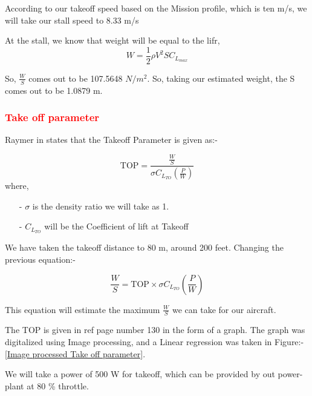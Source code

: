 \documentclass[12 pt]{article}
\begin{document}
According to our takeoff speed based on the Mission profile, which is ten m/s, we will take our stall speed to 8.33 m/s

At the stall, we know that weight will be equal to the lifr,
$$ W = \frac{1}{2} \rho V^2 S C_{L_{max}} $$

So, $\frac{W}{S}$ comes out to be 107.5648 $ N/m^2 $. So, taking our estimated weight, the S comes out to be 1.0879 m.


\subsubsection{\textcolor{red}{Take off parameter}}

Raymer in \cite{Raymer2006} states that the Takeoff Parameter is given as:- 

$$\text{TOP} = \frac{\frac{W}{S}}{ \sigma C_{L_{TO}} \left( \frac{P}{W} \right) }$$
where,
\begin{itemize}
    \item[-] $\sigma$ is the density ratio we will take as 1.
    \item [-] $C_{L_{TO}}$ will be the Coefficient of lift at Takeoff 
\end{itemize}

We have taken the takeoff distance to 80 m, around 200 feet. Changing the previous equation:-

$$ \frac{W}{S} = \text{TOP} \times \sigma C_{L_{TO}} \left( \frac{P}{W} \right) $$

This equation will estimate the maximum $\frac{W}{S}$ we can take for our aircraft.

The TOP is given in ref \cite{Raymer2006} page number 130 in the form of a graph. The graph was digitalized using Image processing, and a Linear regression was taken in Figure:-\ref{Image processed Take off parameter}. 

We will take a power of 500 W for takeoff, which can be provided by out power-plant at 80 \% throttle. 
\end{document}
